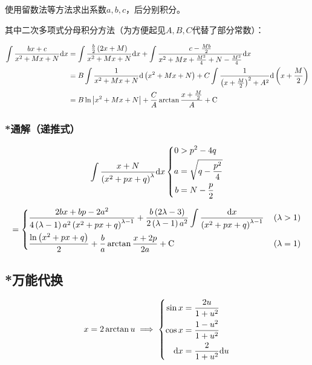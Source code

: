 \documentclass{article}
\begin{document}
使用留数法等方法求出系数$a,b,c$，后分别积分。

其中二次多项式分母积分方法（为方便起见$A,B,C$代替了部分常数）：

\[\begin{aligned}
        \int\frac{bx+c}{x^2+Mx+N}\mathrm d x & =\int\frac{\frac b2\left(2x+M\right)}{x^2+Mx+N}\mathrm d x+\int\frac{c-\frac{Mb}2}{x^2+Mx+\frac{M^2}4+N-\frac{M^2}4}\mathrm d x \\
                                      & =B\int\frac1{x^2+Mx+N}\mathrm d\left(x^2+Mx+N\right)+C\int\frac1{{\left(x+\frac M2\right)^2}+A^2}\mathrm d\left(x+\frac M2\right)                 \\
                                      & =B\ln\left|x^2+Mx+N\right|+\frac CA\arctan\frac{x+\frac M2}A+\mathrm C
    \end{aligned}\]

\subsubsection{*通解（递推式）}

\[\int{\frac{x+N}{\left(x^2+px+q\right)^\lambda}\mathrm dx}
    \left\{\begin{aligned}
        0 & >p^2-4q               \\
        a & =\sqrt{q-\frac{p^2}4} \\
        b & =N-\frac p2
    \end{aligned}\right.\]

\[=\left\{\begin{aligned}
         & \frac{2bx+bp-2a^2}{4\left(\lambda-1\right)a^2\left(x^2+px+q\right)^{\lambda-1}}+\frac{b\left(2\lambda-3\right)}{2\left(\lambda-1\right)a^2}\int\frac{\mathrm d x}{\left(x^2+px+q\right)^{\lambda-1}} &  &
        \left(\lambda>1\right)                                                                                                                                            \\
         & \frac{\ln\left(x^2+px+q\right)}2+\frac ba\arctan{\frac{x+2p}{2a}}+\mathrm C                                                                                      &  &
        \left(\lambda=1\right)                                                                                                                                            \\
    \end{aligned}\right.\]

\subsection{*万能代换}

\[x=2\arctan u\implies
    \left\{\begin{aligned}
        \sin x & =\frac{2u}{1+u^2}    \\
        \cos x & =\frac{1-u^2}{1+u^2} \\
        \mathrm d x   & =\frac2{1+u^2}\mathrm d u
    \end{aligned}\right.\]
\end{document}
